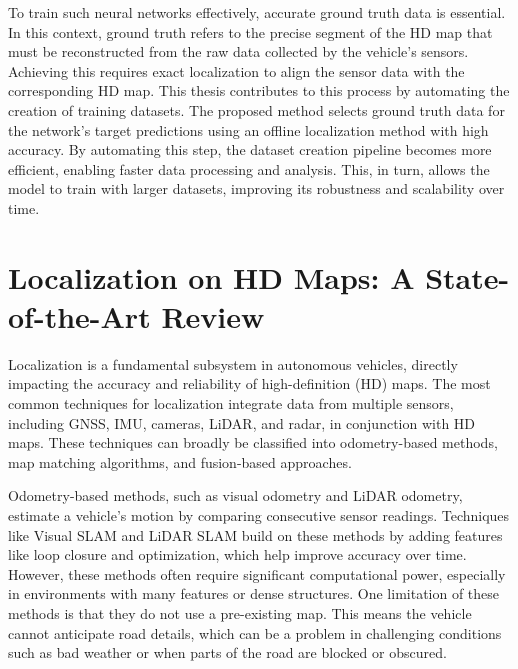 To train such neural networks effectively, accurate ground truth data is essential. In this context, ground truth refers to the precise segment of the HD map that must be reconstructed from the raw data collected by the vehicle's sensors. Achieving this requires exact localization to align the sensor data with the corresponding HD map. This thesis contributes to this process by automating the creation of training datasets. The proposed method selects ground truth data for the network's target predictions using an offline localization method with high accuracy. By automating this step, the dataset creation pipeline becomes more efficient, enabling faster data processing and analysis. This, in turn, allows the model to train with larger datasets, improving its robustness and scalability over time.

\section{Localization on HD Maps: A State-of-the-Art Review}

Localization is a fundamental subsystem in autonomous vehicles, directly impacting the accuracy and reliability of high-definition (HD) maps. The most common techniques for localization integrate data from multiple sensors, including GNSS, IMU, cameras, LiDAR, and radar, in conjunction with HD maps. These techniques can broadly be classified into odometry-based methods, map matching algorithms, and fusion-based approaches.

Odometry-based methods, such as visual odometry and LiDAR odometry, estimate a vehicle's motion by comparing consecutive sensor readings. Techniques like Visual SLAM \cite{10353965} and LiDAR SLAM \cite{9707054} build on these methods by adding features like loop closure and optimization, which help improve accuracy over time. However, these methods often require significant computational power, especially in environments with many features or dense structures. One limitation of these methods is that they do not use a pre-existing map. This means the vehicle cannot anticipate road details, which can be a problem in challenging conditions such as bad weather or when parts of the road are blocked or obscured.


